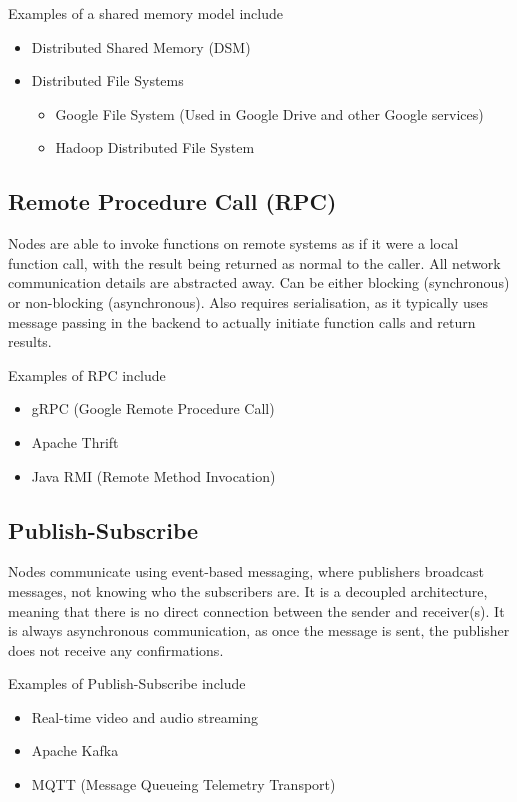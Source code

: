 Examples of a shared memory model include
\begin{itemize}
  \item Distributed Shared Memory (DSM)
  \item Distributed File Systems
  \begin{itemize}
    \item Google File System (Used in Google Drive and other Google services)
    \item Hadoop Distributed File System
  \end{itemize}
\end{itemize}

\subsection*{Remote Procedure Call (RPC)}

Nodes are able to invoke functions on remote systems as if it were a local function call, with the result being returned as normal to the caller. All network communication details are abstracted away. Can be either blocking (synchronous) or non-blocking (asynchronous). Also requires serialisation, as it typically uses message passing in the backend to actually initiate function calls and return results.

Examples of RPC include
\begin{itemize}
  \item gRPC (Google Remote Procedure Call)
  \item Apache Thrift
  \item Java RMI (Remote Method Invocation)
\end{itemize}

\subsection*{Publish-Subscribe}

Nodes communicate using event-based messaging, where publishers broadcast messages, not knowing who the subscribers are. It is a decoupled architecture, meaning that there is no direct connection between the sender and receiver(s). It is always asynchronous communication, as once the message is sent, the publisher does not receive any confirmations.

Examples of Publish-Subscribe include
\begin{itemize}
  \item Real-time video and audio streaming
  \item Apache Kafka
  \item MQTT (Message Queueing Telemetry Transport)
\end{itemize}


